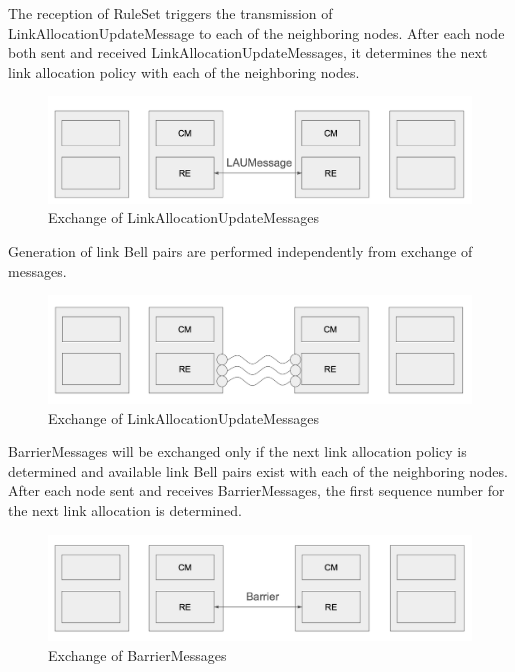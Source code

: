 The reception of RuleSet triggers the transmission of LinkAllocationUpdateMessage to each of the neighboring nodes.
After each node both sent and received LinkAllocationUpdateMessages, it determines the next link allocation policy with each of the neighboring nodes.
\begin{figure}[H]
  \centerline{\includegraphics[width=\columnwidth]{images/lau_negotiation.png}}
  \caption{Exchange of LinkAllocationUpdateMessages}
\end{figure}

Generation of link Bell pairs are performed independently from exchange of messages.
\begin{figure}[H]
  \centerline{\includegraphics[width=\columnwidth]{images/bell_pair_generation.png}}
  \caption{Exchange of LinkAllocationUpdateMessages}
\end{figure}

BarrierMessages will be exchanged only if the next link allocation policy is determined and available link Bell pairs exist with each of the neighboring nodes.
After each node sent and receives BarrierMessages, the first sequence number for the next link allocation is determined.
\begin{figure}[H]
  \centerline{\includegraphics[width=\columnwidth]{images/barrier_negotiation.png}}
  \caption{Exchange of BarrierMessages}
\end{figure}

